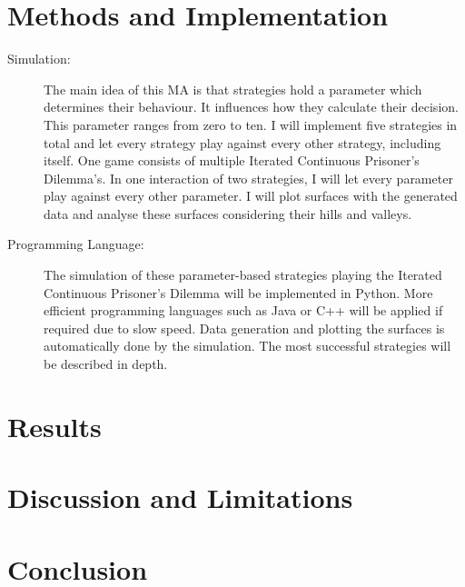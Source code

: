 \documentclass{article}
\begin{document}
\section{Methods and Implementation}

	\begin{description}
		\item[Simulation:]
			The main idea of this MA is that strategies hold a parameter which determines their behaviour. It influences how they calculate their decision. This parameter ranges from zero to ten. I will implement five strategies in total and let every strategy play against every other strategy, including itself. One game consists of multiple Iterated Continuous Prisoner's Dilemma's. In one interaction of two strategies, I will let every parameter play against every other parameter. I will plot surfaces with the generated data and analyse these surfaces considering their hills and valleys.
		\item[Programming Language:]
	The simulation of these parameter-based strategies playing the Iterated Continuous Prisoner's Dilemma will be implemented in Python. More efficient programming languages such as Java or C++ will be applied if required due to slow speed. Data generation and plotting the surfaces is automatically done by the simulation. The most successful strategies will be described in depth.
	\end{description}

\section{Results}

\section{Discussion and Limitations}

\section{Conclusion}
\end{document}
